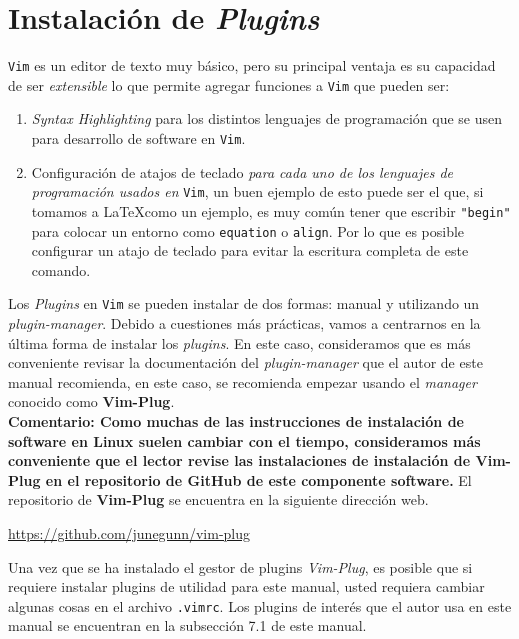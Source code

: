 \documentclass[10pt]{article}
\begin{document}
\section{Instalación de \textit{Plugins}}
\texttt{Vim} es un editor de texto muy básico, pero su principal ventaja es su capacidad de ser \textit{extensible} lo que permite agregar funciones a \texttt{Vim} que pueden ser:
\begin{enumerate}
	\item \textit{Syntax Highlighting} para los distintos lenguajes de programación que se usen para desarrollo de software en \texttt{Vim}.
	\item Configuración de atajos de teclado \textit{para cada uno de los lenguajes de programación usados en} \texttt{Vim}, un buen ejemplo de esto puede ser el que, si tomamos a \LaTeX como un ejemplo, es muy común tener que escribir \texttt{"begin"} para colocar un entorno como \texttt{equation} o \texttt{align}. Por lo que es posible configurar un atajo de teclado para evitar la escritura completa de este comando.  
\end{enumerate}
Los \textit{Plugins} en \texttt{Vim} se pueden instalar de dos formas: manual y utilizando un \textit{plugin-manager}. Debido a cuestiones más prácticas, vamos a centrarnos en la última forma de instalar los \textit{plugins}. En este caso, consideramos que es más conveniente revisar la documentación del \textit{plugin-manager} que el autor de este manual recomienda, en este caso, se recomienda empezar usando el \textit{manager} conocido como \textbf{Vim-Plug}.\\
\textbf{Comentario: Como muchas de las instrucciones de instalación de software en Linux suelen cambiar con el tiempo, consideramos más conveniente que el lector revise las instalaciones de instalación de Vim-Plug en el repositorio de GitHub de este componente software.} El repositorio de \textbf{Vim-Plug} se encuentra en la siguiente dirección web. 
\begin{center}
\url{https://github.com/junegunn/vim-plug}	
\end{center}
Una vez que se ha instalado el gestor de plugins \textit{Vim-Plug}, es posible que si requiere instalar plugins de utilidad para este manual, usted requiera cambiar algunas cosas en el archivo \texttt{.vimrc}. Los plugins de interés que el autor usa en este manual se encuentran en la subsección 7.1 de este manual.  
\end{document}
